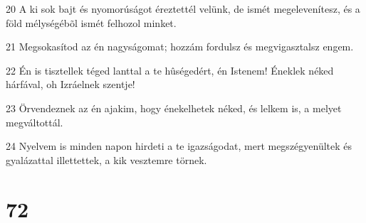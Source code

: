 \par 20 A ki sok bajt és nyomorúságot éreztettél velünk, de ismét megelevenítesz, és a föld mélységébõl ismét felhozol minket.
\par 21 Megsokasítod az én nagyságomat; hozzám fordulsz és megvigasztalsz engem.
\par 22 Én is tisztellek téged lanttal a te hûségedért, én Istenem! Éneklek néked hárfával, oh Izráelnek szentje!
\par 23 Örvendeznek az én ajakim, hogy énekelhetek néked, és lelkem is, a melyet megváltottál.
\par 24 Nyelvem is minden napon hirdeti a te igazságodat, mert megszégyenültek és gyalázattal illettettek, a kik vesztemre törnek.

\chapter{72}

